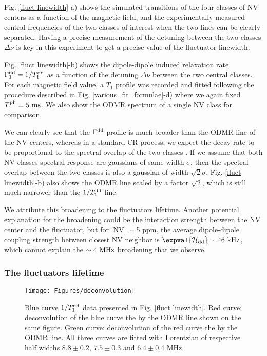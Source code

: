 \documentclass[a4paper,11pt]{report}
\begin{document}
Fig. \ref{fluct linewidth}-a) shows the simulated transitions of the four classes of NV centers as a function of the magnetic field, and the experimentally measured central frequencies of the two classes of interest when the two lines can be clearly separated. Having a precise measurement of the detuning between the two classes $\Delta \nu$ is key in this experiment to get a precise value of the fluctuator linewidth.

Fig. \ref{fluct linewidth}-b) shows the dipole-dipole induced relaxation rate $\Gamma_1^{\rm dd}=1/T_1^{\rm dd}$ as a function of the detuning $\Delta \nu$ between the two central classes. For each magnetic field value, a $T_1$ profile was recorded and fitted following the procedure described in Fig. \ref{various_fit_formulae}-d) where we again fixed $T_1^{\rm ph}=5\ \rm ms$. We also show the ODMR spectrum of a single NV class for comparison.

We can clearly see that the $\Gamma^{\rm dd}$ profile is much broader than the ODMR line of the NV centers, whereas in a standard CR process, we expect the decay rate to be proportional to the spectral overlap of the two classes \citep{hall2016detection}. If we assume that both NV classes spectral response are gaussians of same width $\sigma$, then the spectral overlap between the two classes is also a gaussian of width $\sqrt{2} \sigma$. Fig. \ref{fluct linewidth}-b) also shows the ODMR line scaled by a factor $\sqrt{2}$, which is still much narrower than the $1/T_1^{\rm dd}$ line.

We attribute this broadening to the fluctuators lifetime. Another potential explanation for the broadening could be the interaction strength between the NV center and the fluctuator, but for [NV] $\sim$ 5 ppm, the average dipole-dipole coupling strength between closest NV neighbor is $\expval{\mathcal{H}_{\rm dd}} \sim 46\ \rm kHz$, which cannot explain the $\sim 4\ \rm MHz$ broadening that we observe.

\subsubsection{The fluctuators lifetime}
\begin{figure}[h]
\centering
\texttt{[image: Figures/deconvolution]}
\caption{Blue curve $1/T_1^{\rm dd}$ data presented in Fig. \ref{fluct linewidth}. Red curve: deconvolution of the blue curve the  by the ODMR line shown on the same figure. Green curve: deconvolution of the red curve the  by the ODMR line. All three curves are fitted with Lorentzian of respective half widths $8.8 \pm 0.2$, $7.5 \pm 0.3$ and $6.4 \pm 0.4$ MHz}
\label{deconvolution}
\end{figure}
\end{document}
